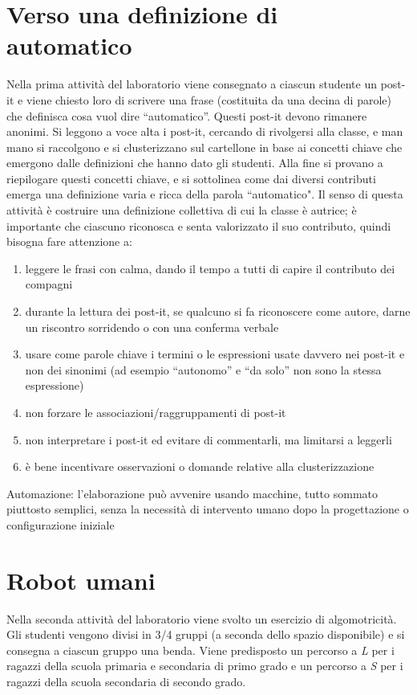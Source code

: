 \documentclass[12pt]{article}
\begin{document}
\section{Verso una definizione di automatico}
Nella prima attività del laboratorio viene consegnato a ciascun studente un post-it e viene chiesto loro di scrivere una frase (costituita da una decina di parole) che definisca cosa vuol dire ``automatico''. Questi post-it devono rimanere anonimi.
Si leggono a voce alta i post-it, cercando di rivolgersi alla classe, e man mano si raccolgono e si clusterizzano sul cartellone in base ai concetti chiave che emergono dalle definizioni che hanno dato gli studenti.
Alla fine si provano a riepilogare questi concetti chiave, e si sottolinea come dai diversi contributi emerga una definizione varia e ricca della parola ``automatico".
Il senso di questa attività è costruire una definizione collettiva di cui la classe è autrice; è importante che ciascuno riconosca e senta valorizzato il suo contributo, quindi bisogna fare attenzione a:
\begin{enumerate}
\item leggere le frasi con calma, dando il tempo a tutti di capire il contributo dei compagni
\item durante la lettura dei post-it, se qualcuno si fa riconoscere come autore, darne un riscontro sorridendo o con una conferma verbale
\item usare come parole chiave i termini o le espressioni usate davvero nei post-it e non dei sinonimi (ad esempio ``autonomo'' e ``da solo'' non sono la stessa espressione)
\item non forzare le associazioni/raggruppamenti di post-it
\item non interpretare i post-it ed evitare di commentarli, ma limitarsi a leggerli
\item è bene incentivare osservazioni o domande relative alla clusterizzazione
\end{enumerate}

Automazione: l'elaborazione può avvenire usando macchine, tutto sommato piuttosto semplici, senza la necessità di intervento umano dopo la progettazione o configurazione iniziale
\section{Robot umani}
Nella seconda attività del laboratorio viene svolto un esercizio di algomotricità.
Gli studenti vengono divisi in 3/4 gruppi (a seconda dello spazio disponibile) e si consegna a ciascun gruppo una benda. Viene predisposto un percorso a \textit{L} per i ragazzi della scuola primaria e secondaria di primo grado e un percorso a \textit{S} per i ragazzi della scuola secondaria di secondo grado. 
\end{document}
